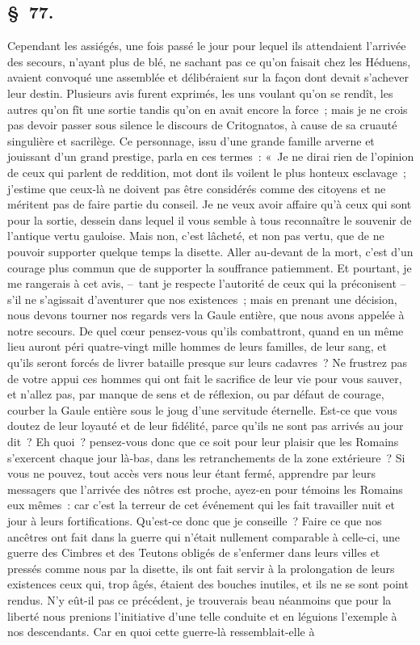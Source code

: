 \documentclass[french,twoside]{book} %
\begin{document}
\subsection[{§ 77.}]{ \textsc{§ 77.} }
\noindent Cependant les assiégés, une fois passé le jour pour lequel ils attendaient l’arrivée des secours, n’ayant plus de blé, ne sachant pas ce qu’on faisait chez les Héduens, avaient convoqué une assemblée et délibéraient sur la façon dont devait s’achever leur destin. Plusieurs avis furent exprimés, les uns voulant qu’on se rendît, les autres qu’on fît une sortie tandis qu’on en avait encore la force ; mais je ne crois pas devoir passer sous silence le discours de Critognatos, à cause de sa cruauté singulière et sacrilège. Ce personnage, issu d’une grande famille arverne et jouissant d’un grand prestige, parla en ces termes : « Je ne dirai rien de l’opinion de ceux qui parlent de reddition, mot dont ils voilent le plus honteux esclavage ; j’estime que ceux-là ne doivent pas être considérés comme des citoyens et ne méritent pas de faire partie du conseil. Je ne veux avoir affaire qu’à ceux qui sont pour la sortie, dessein dans lequel il vous semble à tous reconnaître le souvenir de l’antique vertu gauloise. Mais non, c’est lâcheté, et non pas vertu, que de ne pouvoir supporter quelque temps la disette. Aller au-devant de la mort, c’est d’un courage plus commun que de supporter la souffrance patiemment. Et pourtant, je me rangerais à cet avis, – tant je respecte l’autorité de ceux qui la préconisent – s’il ne s’agissait d’aventurer que nos existences ; mais en prenant une décision, nous devons tourner nos regards vers la Gaule entière, que nous avons appelée à notre secours. De quel cœur pensez-vous qu’ils combattront, quand en un même lieu auront péri quatre-vingt mille hommes de leurs familles, de leur sang, et qu’ils seront forcés de livrer bataille presque sur leurs cadavres ? Ne frustrez pas de votre appui ces hommes qui ont fait le sacrifice de leur vie pour vous sauver, et n’allez pas, par manque de sens et de réflexion, ou par défaut de courage, courber la Gaule entière sous le joug d’une servitude éternelle. Est-ce que vous doutez de leur loyauté et de leur fidélité, parce qu’ils ne sont pas arrivés au jour dit ? Eh quoi ? pensez-vous donc que ce soit pour leur plaisir que les Romains s’exercent chaque jour là-bas, dans les retranchements de la zone extérieure ? Si vous ne pouvez, tout accès vers nous leur étant fermé, apprendre par leurs messagers que l’arrivée des nôtres est proche, ayez-en pour témoins les Romains eux mêmes : car c’est la terreur de cet événement qui les fait travailler nuit et jour à leurs fortifications. Qu'est-ce donc que je conseille ? Faire ce que nos ancêtres ont fait dans la guerre qui n’était nullement comparable à celle-ci, une guerre des Cimbres et des Teutons obligés de s’enfermer dans leurs villes et pressés comme nous par la disette, ils ont fait servir à la prolongation de leurs existences ceux qui, trop âgés, étaient des bouches inutiles, et ils ne se sont point rendus. N'y eût-il pas ce précédent, je trouverais beau néanmoins que pour la liberté nous prenions l’initiative d’une telle conduite et en léguions l’exemple à nos descendants. Car en quoi cette guerre-là ressemblait-elle à 
\end{document}
